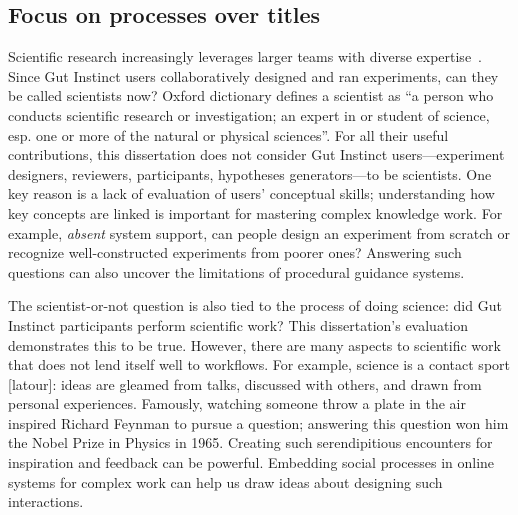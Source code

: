 \subsection{Focus on processes over titles}
Scientific research increasingly leverages larger teams with diverse expertise~\cite{wu2019large}. Since Gut Instinct users collaboratively designed and ran experiments, can they be called scientists now? Oxford dictionary defines a scientist as “a person who conducts scientific research or investigation; an expert in or student of science, esp. one or more of the natural or physical sciences”. For all their useful contributions, this dissertation does not consider Gut Instinct users---experiment designers, reviewers, participants, hypotheses generators---to be scientists. One key reason is a lack of evaluation of users' conceptual skills; understanding how key concepts are linked is important for mastering complex knowledge work. For example, \textit{absent} system support, can people design an experiment from scratch or recognize well-constructed experiments from poorer ones? Answering such questions can also uncover the limitations of procedural guidance systems.

The scientist-or-not question is also tied to the process of doing science: did Gut Instinct participants perform scientific work? This dissertation's evaluation demonstrates this to be true. However, there are many aspects to scientific work that does not lend itself well to workflows. For example, science is a contact sport [latour]: ideas are gleamed from talks, discussed with others, and drawn from personal experiences. Famously, watching someone throw a plate in the air inspired Richard Feynman to pursue a question; answering this question won him the Nobel Prize in Physics in 1965. Creating such serendipitious encounters for inspiration and feedback can be powerful. Embedding social processes in online systems for complex work can help us draw ideas about designing such interactions.\\




